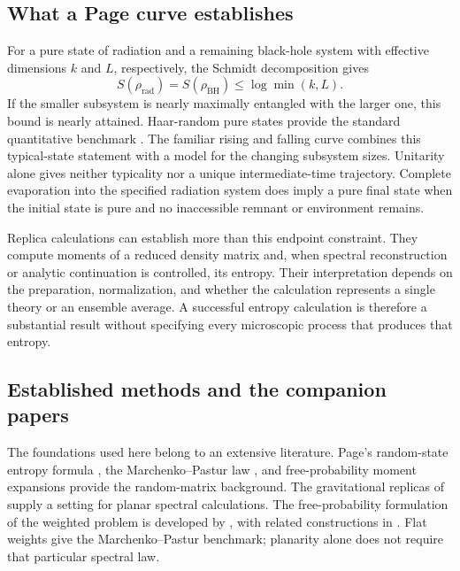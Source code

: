 \documentclass[11pt,letterpaper]{article}
\theoremstyle{plain}
\theoremstyle{definition}
\theoremstyle{remark}
\begin{document}
\subsection*{What a Page curve establishes}

For a pure state of radiation and a remaining black-hole system with effective
dimensions $k$ and $L$, respectively, the Schmidt decomposition gives
\begin{equation}
 S(\rho_{\mathrm{rad}})=S(\rho_{\mathrm{BH}})
 \leq \log\min(k,L).
 \label{eq01:entropy_bound}
\end{equation}
If the smaller subsystem is nearly maximally entangled with the larger one,
this bound is nearly attained. Haar-random pure states provide the standard
quantitative benchmark \citep{page1993,page1993information}. The familiar
rising and falling curve combines this typical-state statement with a model
for the changing subsystem sizes. Unitarity alone gives neither typicality
nor a unique intermediate-time trajectory. Complete evaporation into the
specified radiation system does imply a pure final state when the initial
state is pure and no inaccessible remnant or environment remains.

Replica calculations can establish more than this endpoint constraint. They
compute moments of a reduced density matrix and, when spectral reconstruction
or analytic continuation is controlled, its entropy. Their interpretation
depends on the preparation, normalization, and whether the calculation
represents a single theory or an ensemble average. A successful entropy
calculation is therefore a substantial result without specifying every
microscopic process that produces that entropy.

\subsection*{Established methods and the companion papers}

The foundations used here belong to an extensive literature. Page's
random-state entropy formula \citep{page1993}, the Marchenko--Pastur law
\citep{marchenkopastur1967}, and free-probability moment expansions
\citep{voiculescu1991,speicher1994} provide the random-matrix background.
The gravitational replicas of \citet{pssyetal2022} supply a setting for
planar spectral calculations. The free-probability formulation of the
weighted problem is developed by \citet{wang2023}, with related constructions
in \citet{chengetal2024}. Flat weights give the Marchenko--Pastur benchmark;
planarity alone does not require that particular spectral law.
\end{document}
